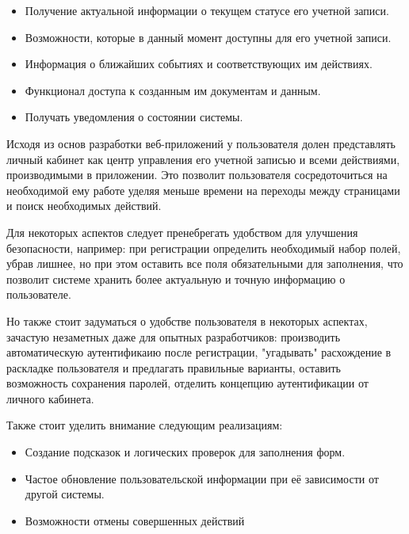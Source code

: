 \begin{itemize}

\item Получение актуальной информации о текущем статусе его учетной записи.

\item Возможности, которые в данный момент доступны для его учетной записи.

\item Информация о ближайших событиях и соответствующих им действиях.

\item Функционал доступа к созданным им документам и данным.

\item Получать уведомления о состоянии системы.

\end{itemize}

Исходя из основ разработки веб-приложений у пользователя долен представлять личный кабинет как центр управления его учетной записью и всеми действиями, производимыми в приложении. Это позволит пользователя сосредоточиться на необходимой ему работе уделяя меньше времени на переходы между страницами и поиск необходимых действий.

Для некоторых аспектов следует пренебрегать удобством для улучшения безопасности, например: при регистрации определить необходимый набор полей, убрав лишнее, но при этом оставить все поля обязательными для заполнения, что позволит системе хранить более актуальную и точную информацию о пользователе.

Но также стоит задуматься о удобстве пользователя в некоторых аспектах, зачастую незаметных даже для опытных разработчиков: производить автоматическую аутентификаию после регистрации, "угадывать" расхождение в раскладке пользователя и предлагать правильные варианты, оставить возможность сохранения паролей, отделить концепцию аутентификации от личного кабинета.

Также стоит уделить внимание следующим реализациям:

\begin{itemize}

\item Создание подсказок и логических проверок для заполнения форм.

\item Частое обновление пользовательской информации при её зависимости от другой системы.

\item Возможности отмены совершенных действий

\end{itemize}

